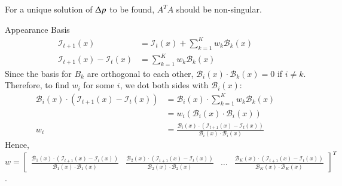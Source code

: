 \documentclass{scrbook}
\begin{document}
For a unique solution of $\Updelta p$ to be found, $A^{T}A$ should be non-singular.

Appearance Basis 
\begin{equation*}
\begin{array}{rl}
\mathcal{I}_{t+1}\left(x\right) & =\mathcal{I}_{t}\left(x\right)+{\sum }_{k=1}^{K}w_{k}\mathcal{B}_{k}(x)\\
\mathcal{I}_{t+1}\left(x\right)-\mathcal{I}_{t}\left(x\right) & ={\sum }_{k=1}^{K}w_{k}\mathcal{B}_{k}(x)
\end{array}
\end{equation*}
Since the basis for $B_{k}$ are orthogonal to each other, $\mathcal{B}_{i}\left(x\right)\cdot \mathcal{B}_{k}\left(x\right)=0$ if $i\neq k$. Therefore, to find $w_{i}$ for some $i$, we dot both sides with $\mathcal{B}_{i}(x)$:
\begin{equation*}
\begin{array}{rl}
\mathcal{B}_{i}\left(x\right)\cdot \left(\mathcal{I}_{t+1}\left(x\right)-\mathcal{I}_{t}\left(x\right)\right) & =\mathcal{B}_{i}\left(x\right)\cdot {\sum }_{k=1}^{K}w_{k}\mathcal{B}_{k}(x)\\ & =w_{i}\left(\mathcal{B}_{i}\left(x\right)\cdot \mathcal{B}_{i}\left(x\right)\right)\\
w_{i} & =\frac{\mathcal{B}_{i}\left(x\right)\cdot \left(\mathcal{I}_{t+1}\left(x\right)-\mathcal{I}_{t}\left(x\right)\right)}{\mathcal{B}_{i}\left(x\right)\cdot \mathcal{B}_{i}\left(x\right)}
\end{array}
\end{equation*}
Hence, $w=\left[\begin{array}{cccc}
\frac{\mathcal{B}_{1}\left(x\right)\cdot \left(\mathcal{I}_{t+1}\left(x\right)-\mathcal{I}_{t}\left(x\right)\right)}{\mathcal{B}_{1}\left(x\right)\cdot \mathcal{B}_{1}\left(x\right)} & \frac{\mathcal{B}_{2}\left(x\right)\cdot \left(\mathcal{I}_{t+1}\left(x\right)-\mathcal{I}_{t}\left(x\right)\right)}{\mathcal{B}_{2}\left(x\right)\cdot \mathcal{B}_{2}\left(x\right)} & \ldots & \frac{\mathcal{B}_{K}\left(x\right)\cdot \left(\mathcal{I}_{t+1}\left(x\right)-\mathcal{I}_{t}\left(x\right)\right)}{\mathcal{B}_{K}\left(x\right)\cdot \mathcal{B}_{K}\left(x\right)}
\end{array}\right]^{T}$.
\end{document}
